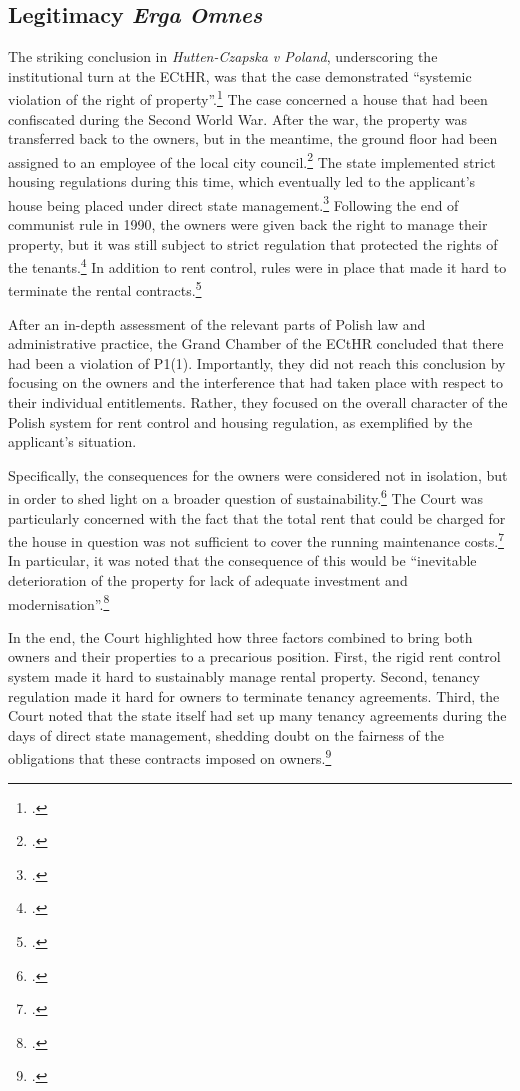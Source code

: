 \subsection{Legitimacy {\it Erga Omnes}}\label{sec:3:4:1}

The striking conclusion in {\it Hutten-Czapska v Poland}, underscoring the institutional turn at the ECtHR, was that the case demonstrated ``systemic violation of the right of property''.\footcite[239]{hutten06} The case concerned a house that had been confiscated during the Second World War. After the war, the property was transferred back to the owners, but in the meantime, the ground floor had been assigned to an employee of the local city council.\footcite[20-31]{hutten06} The state implemented strict housing regulations during this time, which eventually led to the applicant's house being placed under direct state management.\footcite[20-31]{hutten06} Following the end of communist rule in 1990, the owners were given back the right to manage their property, but it was still subject to strict regulation that protected the rights of the tenants.\footcite[31-53]{hutten06} In addition to rent control, rules were in place that made it hard to terminate the rental contracts.\footcite[20-53]{hutten06}

After an in-depth assessment of the relevant parts of Polish law and administrative practice, the Grand Chamber of the ECtHR concluded that there had been a violation of P1(1). Importantly, they did not reach this conclusion by focusing on the owners and the interference that had taken place with respect to their individual entitlements. Rather, they focused on the overall character of the Polish system for rent control and housing regulation, as exemplified by the applicant's situation.

Specifically, the consequences for the owners were considered not in isolation, but in order to shed light on a broader question of sustainability.\footcite[60-61]{hutten06} The Court was particularly concerned with the fact that the total rent that could be charged for the house in question was not sufficient to cover the running maintenance costs.\footcite[224]{hutten06} In particular, it was noted that the consequence of this would be ``inevitable deterioration of the property for lack of adequate investment and modernisation''.\footnote{\cite[224]{hutten06}.}

In the end, the Court highlighted how three factors combined to bring both owners and their properties  to a precarious position. First, the rigid rent control system made it hard to sustainably manage rental property. Second, tenancy regulation made it hard for owners to terminate tenancy agreements. Third, the Court noted that the state itself had set up many tenancy agreements during the days of direct state management, shedding doubt on the fairness of the obligations that these contracts imposed on owners.\footcite[224-225]{hutten06}

